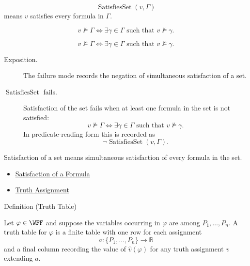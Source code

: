 \begin{remark*}
\[
\operatorname{SatisfiesSet}(v,\Gamma)
\]
means \(v\) satisfies every formula in \(\Gamma\).
\end{remark*}

\begin{remark*}
\[
v\not\models\Gamma
\Longleftrightarrow
\exists\gamma\in\Gamma\text{ such that }v\not\models\gamma.
\]
\end{remark*}

\begin{remark*}
\[
v\not\models\Gamma
\Longleftrightarrow
\exists\gamma\in\Gamma\text{ such that }v\not\models\gamma.
\]
\end{remark*}

\begin{remark*}
\begin{description}
  \item[Exposition.] The failure mode records the negation of simultaneous
  satisfaction of a set.
  \item[\(\operatorname{SatisfiesSet}\) fails.] Satisfaction of the set fails
  when at least one formula in the set is not satisfied:
  \[
  v\not\models\Gamma
  \Longleftrightarrow
  \exists\gamma\in\Gamma\text{ such that }v\not\models\gamma.
  \]
  In predicate-reading form this is recorded as
  \[
  \neg\operatorname{SatisfiesSet}(v,\Gamma).
  \]
\end{description}
\end{remark*}

\begin{remark*}[Interpretation]
Satisfaction of a set means simultaneous satisfaction of every formula in the set.
\end{remark*}

\begin{dependencies}
\begin{itemize}
  \item \hyperref[def:satisfaction-propositional-formula]{Satisfaction of a Formula}
  \item \hyperref[def:truth-assignment-propositional-logic]{Truth Assignment}
\end{itemize}
\end{dependencies}
\begin{definitionbox}{Definition (Truth Table)}
\begin{definition}
\label{def:truth-table-propositional-logic}
Let \(\varphi\in\WFF\) and suppose the variables occurring in \(\varphi\) are among \(P_1,\ldots,P_n\). A truth table for \(\varphi\) is a finite table with one row for each assignment
\[
a:\{P_1,\ldots,P_n\}\to\mathbb{B}
\]
and a final column recording the value of \(\widehat v(\varphi)\) for any truth assignment \(v\) extending \(a\).
\end{definition}
\end{definitionbox}

